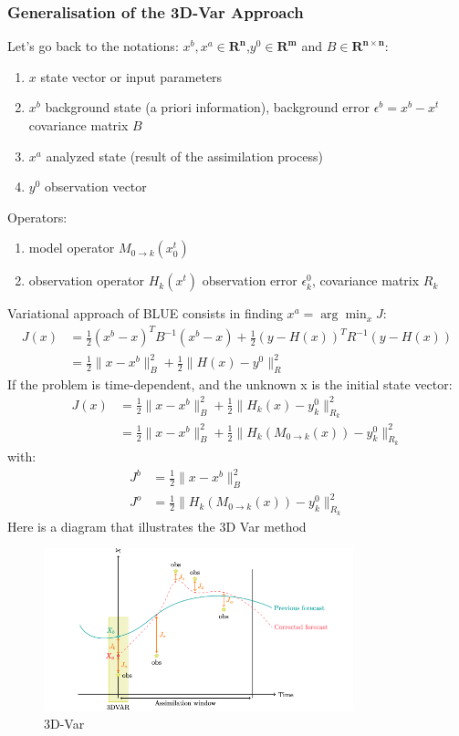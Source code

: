 \subsubsection{Generalisation of the 3D-Var Approach}
\noindent Let's go back to the notations:
\noindent  $x^b ,x^a\in \mathbf{R^n}$,$y^0 \in \mathbf{R^m} $ and $B \in \mathbf{R^{n\times n}}$:
 \begin{enumerate}[label=\textbullet]
		\item $x$ state vector or input parameters
		\item $x^{b}$ background state (a priori information), background  error $\epsilon^b=x^b-x^t$ covariance matrix $B$
		\item $x^{a}$ analyzed state (result of the assimilation process)
		\item $y^0$ observation vector
	\end{enumerate}
\noindent Operators:
    \begin{enumerate}[label=\textbullet]
		\item model operator $M_{0 \rightarrow k}(x_0^t)$
		\item observation operator $H_k(x^t)$ observation error $\epsilon_k^0$, covariance matrix $R_k$
	\end{enumerate}
\noindent Variational approach of BLUE consists in finding $x^a=\arg\min_{x}J$:
$$\begin{aligned}
J(x)&=\frac{1}{2}(x^b-x)^TB^{-1}(x^b-x)+\frac{1}{2}(y-H(x))^TR^{-1}(y-H(x)) \\
&=\frac{1}{2}\|x-x^b\|_B^2+\frac{1}{2}\|H(x)-y^0\|_R^2
\end{aligned}$$
If the problem is time-dependent, and the unknown x is the initial state vector:
$$\begin{aligned}
J(x)&=\frac{1}{2}\|x-x^b\|_B^2+\frac{1}{2}\|H_k(x)-y_k^0\|_{R_{k}}^2 \\
&=\frac{1}{2}\|x-x^b\|_B^2+\frac{1}{2}\|H_k(M_{0 \rightarrow k}(x))-y_k^0\|_{R_{k}}^2
\end{aligned}$$
with:
$$\begin{aligned}
J^b&=\frac{1}{2}\|x-x^b\|_B^2\\
J^o&=\frac{1}{2}\|H_k(M_{0 \rightarrow k}(x))-y_k^0\|_{R_{k}}^2
\end{aligned}$$
\vspace*{5mm}
Here is a diagram that illustrates the 3D Var method 
\begin{figure}
    \centering
		\includegraphics[width=0.8\textwidth]{"images/enkf/schema_3D_Var.png"}
		\caption{3D-Var}
\end{figure}
